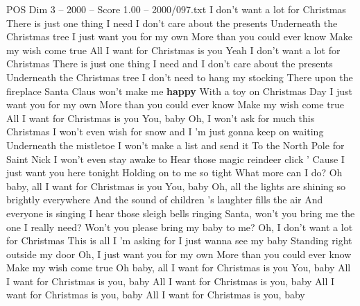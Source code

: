 \begin{textsample}{POS Dim 3 – 2000 – Score 1.00 – 2000/097.txt}  \label{ex:f3_pos_037}
I don't want a lot for Christmas There is just one thing I need I don't care about the presents Underneath the Christmas tree I just want you for my own More than you could ever know Make my wish come true All I want for Christmas is you Yeah I don't want a lot for Christmas There is just one thing I need and I don't care about the presents Underneath the Christmas tree I don't need to hang my stocking There upon the fireplace Santa Claus won't make me \textbf{happy} With a toy on Christmas Day I just want you for my own More than you could ever know Make my wish come true All I want for Christmas is you You, baby Oh, I won't ask for much this Christmas I won't even wish for snow and I 'm just gonna keep on waiting Underneath the mistletoe I won't make a list and send it To the North Pole for Saint Nick I won't even stay awake to Hear those magic reindeer click ' Cause I just want you here tonight Holding on to me so tight What more can I do?
Oh baby, all I want for Christmas is you You, baby Oh, all the lights are shining so brightly everywhere And the sound of children 's laughter fills the air And everyone is singing I hear those sleigh bells ringing Santa, won't you bring me the one I really need?
Won't you please bring my baby to me?
Oh, I don't want a lot for Christmas This is all I 'm asking for I just wanna see my baby Standing right outside my door Oh, I just want you for my own More than you could ever know Make my wish come true Oh baby, all I want for Christmas is you You, baby All I want for Christmas is you, baby All I want for Christmas is you, baby All I want for Christmas is you, baby All I want for Christmas is you, baby

\end{textsample}
